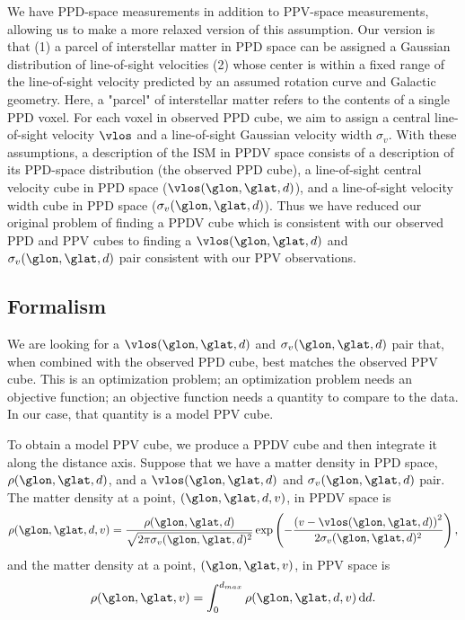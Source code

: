 We have PPD-space measurements in addition to PPV-space measurements, allowing us to make a more relaxed version of this assumption. 
Our version is that (1) a parcel of interstellar matter in PPD space can be assigned a Gaussian distribution of line-of-sight velocities (2) whose center is within a fixed range of the line-of-sight velocity predicted by an assumed rotation curve and Galactic geometry. 
Here, a "parcel" of interstellar matter refers to the contents of a single PPD voxel. 
For each voxel in observed PPD cube, we aim to assign a central line-of-sight velocity $\vlos$ and a line-of-sight Gaussian velocity width $\sigma_v$. 
With these assumptions, a description of the ISM in PPDV space consists of a description of its PPD-space distribution (the observed PPD cube), a line-of-sight central velocity cube in PPD space ($\vlos(\glon, \glat, d)$), and a line-of-sight velocity width cube in PPD space ($\sigma_v (\glon, \glat, d)$). 
Thus we have reduced our original problem of finding a PPDV cube which is consistent with our observed PPD and PPV cubes to finding a $\vlos(\glon, \glat, d)$ and $\sigma_v(\glon, \glat, d)$ pair consistent with our PPV observations.


\subsection{Formalism}
\label{sec:KT-method}
We are looking for a $\vlos(\glon, \glat, d)$ and $\sigma_v(\glon, \glat, d)$ pair that, when combined with the observed PPD cube, best matches the observed PPV cube. 
This is an optimization problem; an optimization problem needs an objective function; an objective function needs a quantity to compare to the data. 
In our case, that quantity is a model PPV cube.

To obtain a model PPV cube, we produce a PPDV cube and then integrate it along the distance axis. 
Suppose that we have a matter density in PPD space, $\rho(\glon, \glat, d)$, and a $\vlos(\glon, \glat, d)$ and $\sigma_v(\glon, \glat, d)$ pair. 
The matter density at a point, $(\glon, \glat, d, v)$, in PPDV space is 
\begin{equation}
 \label{eqn:ppdv_cont}
  \rho(\glon, \glat, d, v) = \frac{\rho(\glon, \glat, d)}{\sqrt{2 \pi \sigma_v(\glon, \glat, d)^2}} 
    \exp\left(- \frac{\left( v - \vlos(\glon, \glat, d) \right)^2}{2 \sigma_v(\glon, \glat, d)^2} \right),
\end{equation}
and the matter density at a point, $(\glon, \glat, v)$, in PPV space is
\begin{equation}
  \label{eqn:ppv_cont}
  \rho(\glon, \glat, v) = \int_0^{d_{max}} \rho(\glon, \glat, d, v) \, {\rm d}d.
\end{equation}

